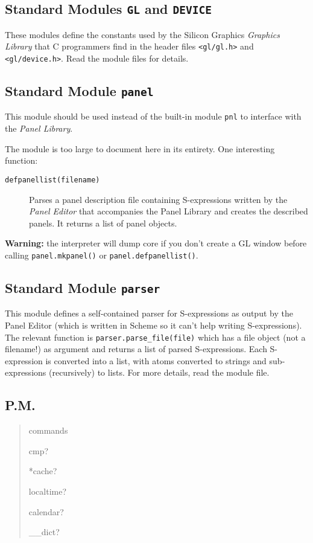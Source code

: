 \subsection{Standard Modules {\tt GL} and {\tt DEVICE}}

These modules define the constants used by the Silicon Graphics
{\em Graphics Library}
that C programmers find in the header files
{\tt <gl/gl.h>}
and
{\tt <gl/device.h>}.
Read the module files for details.

\subsection{Standard Module {\tt panel}}

This module should be used instead of the built-in module
{\tt pnl}
to interface with the
{\em Panel Library}.

The module is too large to document here in its entirety.
One interesting function:
\begin{description}
\item[{\tt defpanellist(filename)}]
Parses a panel description file containing S-expressions written by the
{\em Panel Editor}
that accompanies the Panel Library and creates the described panels.
It returns a list of panel objects.
\end{description}

{\bf Warning:}
the {\Python} interpreter will dump core if you don't create a GL window
before calling
{\tt panel.mkpanel()}
or
{\tt panel.defpanellist()}.

\subsection{Standard Module {\tt parser}}

This module defines a self-contained parser for S-expressions as output
by the Panel Editor (which is written in Scheme so it can't help writing
S-expressions).
The relevant function is
{\tt parser.parse\_file(file)}
which has a file object (not a filename!) as argument and returns a list
of parsed S-expressions.
Each S-expression is converted into a {\Python} list, with atoms converted
to {\Python} strings and sub-expressions (recursively) to {\Python} lists.
For more details, read the module file.

\subsection{P.M.}

\begin{verse}
commands

cmp?

*cache?

localtime?

calendar?

\_\_dict?
\end{verse}


